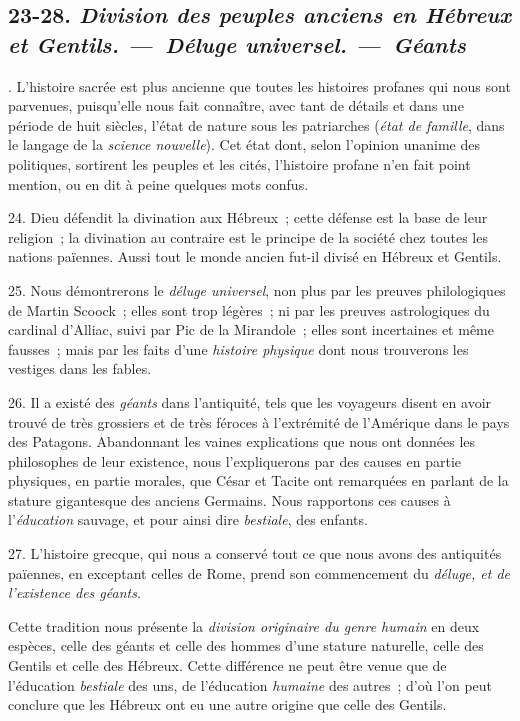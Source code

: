 \documentclass[french,twoside]{book} %
\begin{document}
\subsection[{23-28. Division des peuples anciens en Hébreux et Gentils. — Déluge universel. — Géants}]{ \textsc{23-28. } {\itshape Division des peuples anciens en Hébreux et Gentils. — Déluge universel. — Géants} }
. L’histoire sacrée est plus ancienne que toutes les histoires profanes qui nous sont parvenues, puisqu’elle nous fait connaître, avec tant de détails et dans une période de huit siècles, l’état de nature sous les patriarches ({\itshape état de famille}, dans le langage de la {\itshape science nouvelle}). Cet état dont, selon l’opinion unanime des politiques, sortirent les peuples et les cités, l’histoire profane n’en fait point mention, ou en dit à peine quelques mots confus.\par
24. Dieu défendit la divination aux Hébreux ; cette défense est la base de leur religion ; la divination au contraire est le principe de la société chez  toutes les nations païennes. Aussi tout le monde ancien fut-il divisé en Hébreux et Gentils.\par
25. Nous démontrerons le {\itshape déluge universel}, non plus par les preuves philologiques de Martin Scoock ; elles sont trop légères ; ni par les preuves astrologiques du cardinal d’Alliac, suivi par Pic de la Mirandole ; elles sont incertaines et même fausses ; mais par les faits d’une {\itshape histoire physique} dont nous trouverons les vestiges dans les fables.\par
26. Il a existé des {\itshape géants} dans l’antiquité, tels que les voyageurs disent en avoir trouvé de très grossiers et de très féroces à l’extrémité de l’Amérique dans le pays des Patagons. Abandonnant les vaines explications que nous ont données les philosophes de leur existence, nous l’expliquerons par des causes en partie physiques, en partie morales, que César et Tacite ont remarquées en parlant de la stature gigantesque des anciens Germains. Nous rapportons ces causes à l’{\itshape éducation} sauvage, et pour ainsi dire {\itshape bestiale}, des enfants.\par
27. L’histoire grecque, qui nous a conservé tout ce que nous avons des antiquités païennes, en exceptant celles de Rome, prend son commencement du {\itshape déluge, et de l’existence des géants}.\par
Cette tradition nous présente la {\itshape division originaire du genre humain} en deux espèces, celle des géants et celle des hommes d’une stature naturelle,  celle des Gentils et celle des Hébreux. Cette différence ne peut être venue que de l’éducation {\itshape bestiale} des uns, de l’éducation {\itshape humaine} des autres ; d’où l’on peut conclure que les Hébreux ont eu une autre origine que celle des Gentils.
\end{document}

